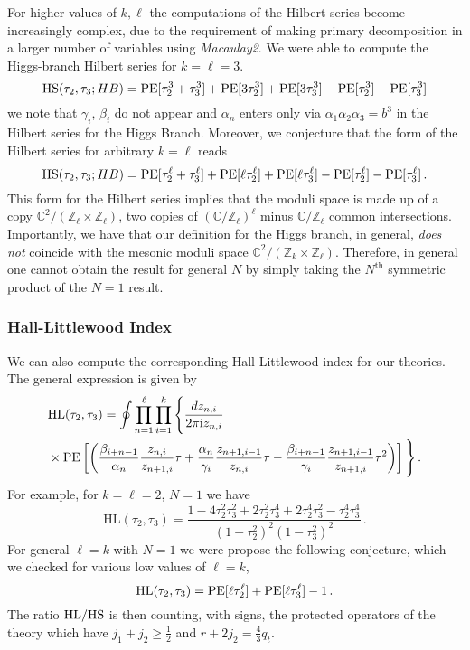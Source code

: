 \documentclass[main.tex]{subfiles}
\begin{document}
For higher values of $k,\ell$ the computations of the Hilbert series become increasingly complex, due to the requirement of making primary decomposition in a larger number of variables using \textit{Macaulay2}. We were able to compute the Higgs-branch Hilbert series for $k=\ell=3$.
\begin{equation}
\textrm{HS}(\tau_2,\tau_3;HB)=\operatorname{\mathrm{PE}}[\tau_2^{3}+\tau_3^{3}]+\operatorname{\mathrm{PE}}[3\tau_2^{3}]+\operatorname{\mathrm{PE}}[3\tau_3^{3}]-\operatorname{\mathrm{PE}}[\tau_2^{3}]-\operatorname{\mathrm{PE}}[\tau_3^{3}]
\end{equation}
we note that $\gamma_i$, $\beta_i$ do not appear and $\alpha_n$ enters only via $\alpha_1\alpha_2\alpha_3=b^3$ in the Hilbert series for the Higgs Branch. Moreover, we conjecture that the form of the Hilbert series for arbitrary $k=\ell$ reads
\begin{equation}
\textrm{HS}(\tau_2,\tau_3;HB)=\operatorname{\mathrm{PE}}[\tau_2^{\ell}+\tau_3^{\ell}]+\operatorname{\mathrm{PE}}[\ell\tau_2^{\ell}]+\operatorname{\mathrm{PE}}[\ell\tau_3^{\ell}]-\operatorname{\mathrm{PE}}[\tau_2^{\ell}]-\operatorname{\mathrm{PE}}[\tau_3^{\ell}]\,.
\end{equation}
This form for the Hilbert series implies that the moduli space is made up of a copy $\mathbb{C}^2/(\mathbb{Z}_{\ell}\times\mathbb{Z}_{\ell})$, two copies of $(\mathbb{C}/\mathbb{Z}_{\ell})^{\ell}$ minus $\mathbb{C}/\mathbb{Z}_{\ell}$ common intersections.
Importantly, we have that our definition for the Higgs branch, in general, \textit{does not} coincide with the mesonic moduli space $\mathbb{C}^2/(\mathbb{Z}_k\times\mathbb{Z}_{\ell})$. Therefore, in general one cannot obtain the result for general $N$ by simply taking the $N^{\text{th}}$ symmetric product of the $N=1$ result.
\subsubsection{Hall-Littlewood Index}
We can also compute the corresponding Hall-Littlewood index for our theories.
The general expression is given by
\begin{equation}\label{eq:HLlk}
\begin{aligned}
&\textrm{HL}(\tau_2,\tau_3) =\oint\prod_{n=1}^{\ell}\prod_{i=1}^k\Bigg\{\frac{dz_{n,i}}{2\pi\mathrm{i} z_{n,i}}\\
&\times\operatorname{\mathrm{PE}}\left[\left(\frac{\beta_{i+n-1}}{\alpha_n}\frac{z_{n,i}}{z_{n+1,i}}\tau+\frac{\alpha_n}{\gamma_i}\frac{z_{n+1,i-1}}{z_{n,i}}\tau-\frac{\beta_{i+n-1}}{\gamma_i}\frac{z_{n+1,i-1}}{z_{n+1,i}}\tau^2\right)\right]\Bigg\}\,.
\end{aligned}
\end{equation}
For example, for $k=\ell=2$, $N=1$ we have
\begin{equation}
\textrm{HL}(\tau_2,\tau_3) = \frac{1-4\tau_2^2\tau_3^2+2\tau_2^2\tau_3^4+2\tau_2^4\tau_3^2-\tau_2^4\tau_3^4}{(1-\tau_2^2)^2(1-\tau_3^2)^2}\,.
\end{equation}
For general $\ell=k$ with $N=1$ we were propose the following conjecture, which we checked for various low values of $\ell=k$,
\begin{equation}\label{eqn:HLarbell}
\textrm{HL}(\tau_2,\tau_3) = \operatorname{\mathrm{PE}}[\ell \tau_2^{\ell}]+\operatorname{\mathrm{PE}}[\ell \tau_3^\ell]-1\,.
\end{equation}
The ratio $\textrm{HL}/\textrm{HS}$ is then counting, with signs, the protected operators of the theory which have $j_1+j_2\geq\frac{1}{2}$ and $r+2j_2=\frac{4}{3}q_t$.
\end{document}
